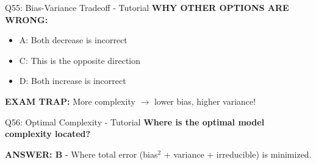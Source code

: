\documentclass[8pt]{beamer}
\begin{document}
\begin{frame}{Q55: Bias-Variance Tradeoff - Tutorial}
		\vspace{0.05cm}
		\textcolor{myred}{\textbf{WHY OTHER OPTIONS ARE WRONG:}}
		\begin{itemize}
			\item \textcolor{myred}{A:} Both decrease is incorrect
			\item \textcolor{myred}{C:} This is the opposite direction
			\item \textcolor{myred}{D:} Both increase is incorrect
		\end{itemize}
		
		\textcolor{myred}{\textbf{EXAM TRAP:}} More complexity $\to$ lower bias, higher variance!
	\end{frame}
	
	\begin{frame}{Q56: Optimal Complexity - Tutorial}
		\fontsize{6.5}{7.5}\selectfont
		\textbf{Where is the optimal model complexity located?}
		
		\vspace{0.05cm}
		\textcolor{myblue}{\textbf{ANSWER: B}} - Where total error (bias$^2$ + variance + irreducible) is minimized.
		

\end{frame}
\end{document}
